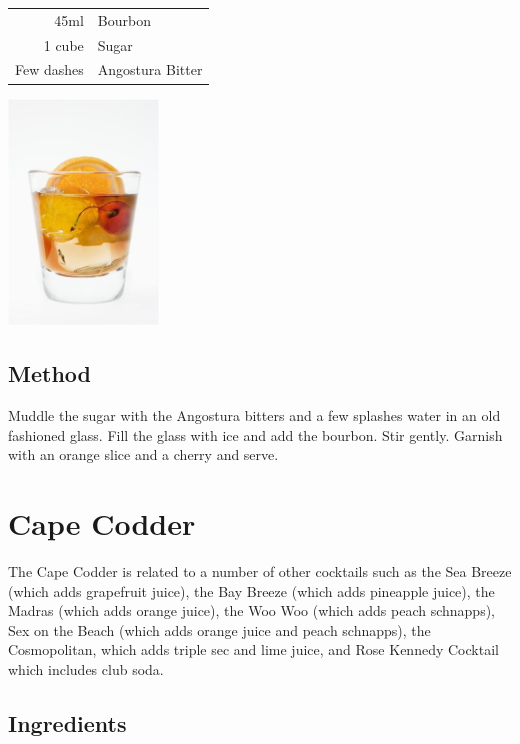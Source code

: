 \documentclass[12pt, letterpaper]{article}
\begin{document}
\begin{multicols}{2}

\begin{tabular} { r | l}
    45ml & Bourbon \\
    1 cube & Sugar \\
    Few dashes  & Angostura Bitter
\end{tabular}

\includegraphics[height=6cm]{oldfashioned}

\end{multicols}

\subsection*{Method}
Muddle the sugar with the Angostura bitters and a few splashes water in an old fashioned glass.
Fill the glass with ice and add the bourbon. Stir gently. Garnish with an orange slice and a cherry and serve.

\pagebreak
\section{Cape Codder}
The Cape Codder is related to a number of other cocktails such as the Sea Breeze (which adds grapefruit juice),
the Bay Breeze (which adds pineapple juice), the Madras (which adds orange juice), 
the Woo Woo (which adds peach schnapps), Sex on the Beach (which adds orange juice and peach schnapps),
the Cosmopolitan, which adds triple sec and lime juice,
and Rose Kennedy Cocktail which includes club soda. 
\subsection*{Ingredients}
\end{document}
